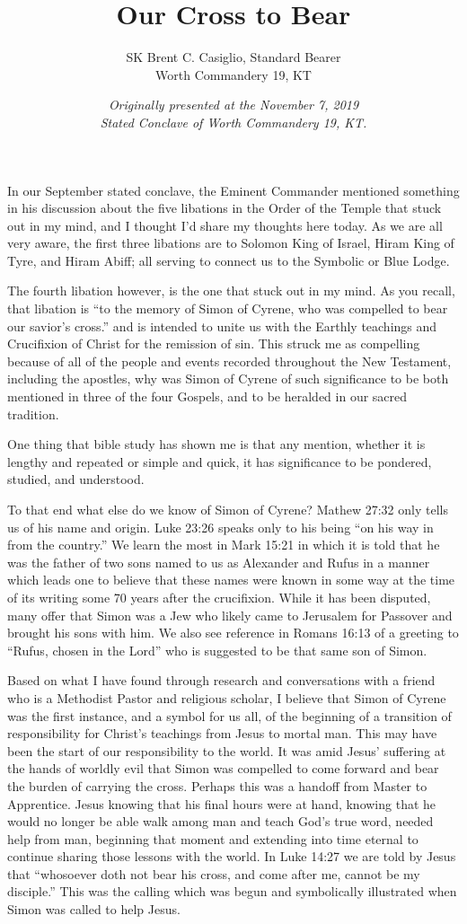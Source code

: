\documentclass[letterpaper,11pt]{article}
\title{Our Cross to Bear}
\author{SK Brent C. Casiglio, Standard Bearer\\Worth Commandery \textnumero{} 19, KT}
\date{\emph{Originally presented at the November 7, 2019\\Stated Conclave of Worth Commandery \textnumero{} 19, KT.}}
\begin{document}
	
	\maketitle
	
	In our September stated conclave, the Eminent Commander mentioned something in his discussion about the five libations in the Order of the Temple that stuck out in my mind, and I thought I'd share my thoughts here today.  As we are all very aware, the first three libations are to Solomon King of Israel, Hiram King of Tyre, and Hiram Abiff; all serving to connect us to the Symbolic or Blue Lodge.
	
	The fourth libation however, is the one that stuck out in my mind.  As you recall, that libation is ``to the memory of Simon of Cyrene, who was compelled to bear our savior's cross.'' and is intended to unite us with the Earthly teachings and Crucifixion of Christ for the remission of sin.  This struck me as compelling because of all of the people and events recorded throughout the New Testament, including the apostles, why was Simon of Cyrene of such significance to be both mentioned in three of the four Gospels, and to be heralded in our sacred tradition.
	
	One thing that bible study has shown me is that any mention, whether it is lengthy and repeated or simple and quick, it has significance to be pondered, studied, and understood.
	
	To that end what else do we know of Simon of Cyrene?  Mathew 27:32 only tells us of his name and origin.  Luke 23:26 speaks only to his being ``on his way in from the country.''  We learn the most in Mark 15:21 in which it is told that he was the father of two sons named to us as Alexander and Rufus in a manner which leads one to believe that these names were known in some way at the time of its writing some 70 years after the crucifixion.  While it has been disputed, many offer that Simon was a Jew who likely came to Jerusalem for Passover and brought his sons with him.  We also see reference in Romans 16:13 of a greeting to ``Rufus, chosen in the Lord'' who is suggested to be that same son of Simon.
	
	Based on what I have found through research and conversations with a friend who is a Methodist Pastor and religious scholar, I believe that Simon of Cyrene was the first instance, and a symbol for us all, of the beginning of a transition of responsibility for Christ's teachings from Jesus to mortal man.  This may have been the start of our responsibility to the world.  It was amid Jesus' suffering at the hands of worldly evil that Simon was compelled to come forward and bear the burden of carrying the cross.  Perhaps this was a handoff from Master to Apprentice.  Jesus knowing that his final hours were at hand, knowing that he would no longer be able walk among man and teach God's true word, needed help from man, beginning that moment and extending into time eternal to continue sharing those lessons with the world.  In Luke 14:27 we are told by Jesus that ``whosoever doth not bear his cross, and come after me, cannot be my disciple.''  This was the calling which was begun and symbolically illustrated when Simon was called to help Jesus.
	
\end{document}
